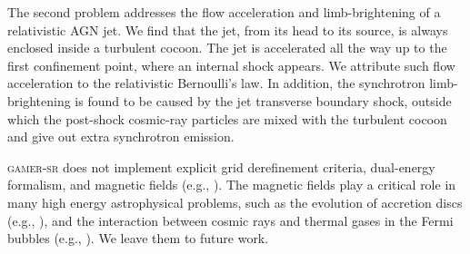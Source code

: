 The second problem addresses the flow acceleration and limb-brightening of a relativistic AGN jet. We find that the jet, from its head to its source, is always enclosed inside a turbulent cocoon. The jet is accelerated all the way up to the first confinement point, where an internal shock appears. We attribute such flow acceleration to the relativistic Bernoulli's law. In addition, the synchrotron limb-brightening is found to be caused by the jet transverse boundary shock, outside which the post-shock cosmic-ray particles are mixed with the turbulent cocoon and give out extra synchrotron emission.

\textsc{gamer-sr} does not implement explicit grid derefinement criteria, dual-energy formalism, and magnetic fields (e.g., \citealt{Stone2020}). The magnetic fields play a critical role in many high energy astrophysical problems, such as the evolution of accretion discs (e.g., \citealt{Blandford1982}), and the interaction between cosmic rays and thermal gases in the Fermi bubbles (e.g., \citealt{Yang2017}). We leave them to future work.


